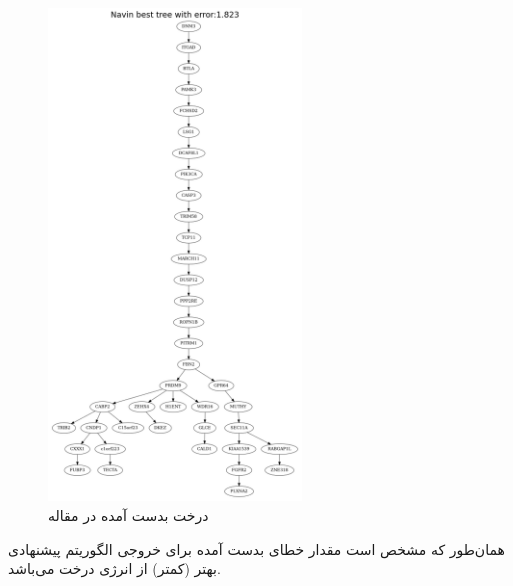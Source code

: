 \begin{figure}[!ht]
	\centering
	\includegraphics[width=0.6\textwidth]{img/chaps/er/navin}
	\caption{درخت بدست آمده در مقاله }
	\label{fig:ch_er:navin_tree}
\end{figure}
\noindent
همان‌طور که مشخص است مقدار خطای بدست آمده برای خروجی الگوریتم پیشنهادی بهتر (کمتر) از انرژی درخت  می‌باشد.
